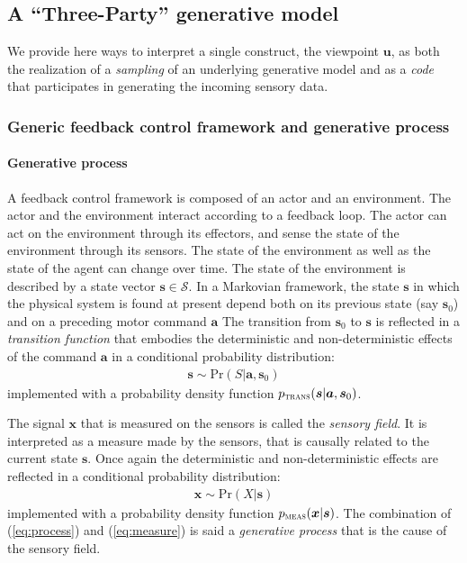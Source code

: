 \documentclass[12pt,twoside,openright]{article}
\begin{document}
\subsection{A ``Three-Party'' generative model}\label{sec:three-party}

We provide here ways to interpret a single construct, the viewpoint $\boldsymbol{u}$, as both the realization of a \emph{sampling} of an underlying generative model and as a \emph{code} that participates in generating the incoming sensory data.

\subsubsection{Generic feedback control framework and generative process}
\paragraph{Generative process}
A feedback control framework is composed of an actor and an environment. The actor and the environment interact according to a feedback loop. 
The actor can act on the environment through its effectors, and sense the state of the environment through its sensors. 
The state of the environment as well as the state of the agent can change over time. The state of the environment is described by a state vector $\boldsymbol{s} \in \mathcal{S}$.
In a Markovian framework, the state $\boldsymbol{s}$ in which the physical system is found at present depend both on its previous state (say $\boldsymbol{s}_0$) and on a preceding motor command $\boldsymbol{a}$ 
The transition from $\boldsymbol{s}_0$ to $\boldsymbol{s}$ is reflected in a \emph{transition function} that embodies the deterministic and non-deterministic effects of the command $\boldsymbol{a}$ in a conditional probability distribution:  
\begin{align}
\boldsymbol{s} \sim \text{Pr}(S|\boldsymbol{a},\boldsymbol{s}_0) \label{eq:process}
\end{align}
implemented with a probability density function 
$p_\text{\sc trans}(\boldsymbol{s}|\boldsymbol{a},\boldsymbol{s}_0)$.


The signal $\boldsymbol{x}$ that is measured on the sensors is called the \emph{sensory field}. It is interpreted as a measure made by the sensors, that is causally related to the current state $\boldsymbol{s}$. Once again the deterministic and non-deterministic effects are reflected in a conditional probability distribution:
\begin{align}
\boldsymbol{x} \sim \text{Pr}(X|\boldsymbol{s})\label{eq:measure}
\end{align}
implemented with a probability density function 
$p_\text{\sc meas}(\boldsymbol{x}|\boldsymbol{s})$.
The combination of  (\ref{eq:process}) and (\ref{eq:measure}) is said a \emph{generative process} that is the cause of the sensory field. 
\end{document}

